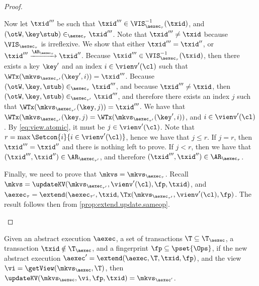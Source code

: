 \begin{proof}
\begin{itemize}
\begin{itemize}
Now let $\txid'''$ be such that $\txid''' \in \VIS^{-1}_{\aexec_{\tau}}(\txid)$, and $(\otW, \key \stub) \in_{\aexec_{\tau}} \txid'''$. 
Note that $\txid''' \neq \txid$ because $\VIS_{\aexec_{\tau}}$ is irreflexive.
We show that either $\txid''' = \txid''$, or $\txid''' \xrightarrow{\AR_{\aexec_{\tau}}} \txid''$. 
Because $\txid''' \in \VIS^{-1}_{\aexec_{\tau}}(\txid)$, then there exists a key $\key'$ and an index $i \in \vienv'(\cl)$ 
such that $\WTx(\mkvs_{\aexec_{\tau'}}(\key', i)) = \txid'''$. Because $(\otW, \key, \stub) \in_{\aexec_{\tau}} \txid'''$, 
and because $\txid''' \neq \txid$, then $(\otW, \key, \stub) \in_{\aexec_{\tau'}} \txid'''$, and therefore there exists 
an index $j$ such that $\WTx(\mkvs_{\aexec_{\tau'}}(\key, j)) = \txid'''$. We have that $\WTx(\mkvs_{\aexec_{\tau'}}(\key, j) = 
\WTx(\mkvs_{\aexec_{\tau'}}(\key', i))$, and $i \in \vienv'(\cl)$. By \cref{eq:view.atomic}, it must be $j \in \vienv'(\cl)$. 
Note that $r = \max\Setcon{i }{ i \in \vienv'(\cl)}$, hence we have that $j \leq r$. If $j = r$, then $\txid''' = \txid''$ and 
there is nothing left to prove. If $j < r$, then we have that $(\txid''', \txid'') \in \AR_{\aexec_{\tau'}}$, and 
therefore $(\txid''', \txid'') \in \AR_{\aexec_{\tau}}$.
\end{itemize}
Finally, we need to prove that $\mkvs = \mkvs_{\aexec_{\tau}}$.
Recall $\mkvs = \updateKV(\mkvs_{\aexec_{\tau'}}, \vienv'(\cl), \fp, \txid)$, 
and $\aexec_{\tau} = \extend(\aexec_{\tau'}, \txid, \Tx(\mkvs_{\aexec_{\tau'}}, \vienv'(\cl), \fp)$. 
The result follows then from \cref{prop:extend.update.sameop}. 
\end{itemize}
\end{proof}


\begin{proposition}
\label{prop:extend.update.sameop}
Given an abstract execution $\aexec$, a set of transactions $\T \subseteq \T_{\aexec}$,
a transaction $\txid \notin \T_{\aexec}$, and a fingerprint $\fp \subseteq \pset{\Ops}$,
if the new abstract execution $\aexec' = \extend(\aexec, \T, \txid, \fp)$,
and the view $\vi = \getView(\mkvs_{\aexec}, \T)$,
then $\updateKV(\mkvs_{\aexec}, \vi, \fp, \txid) = \mkvs_{\aexec'}$.
\end{proposition}

